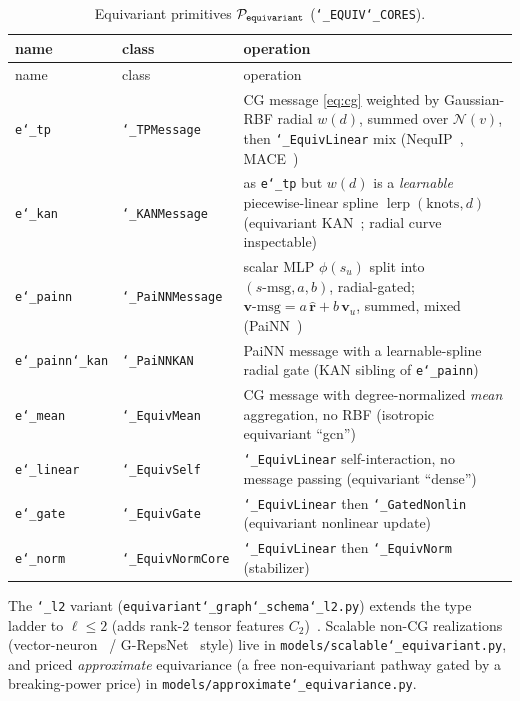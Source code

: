 \documentclass[11pt]{article}
\newcommand{\allowbreakhere}{\discretionary{}{}{}}
\newcommand{\code}[1]{\texttt{\def\_{\char`_\allowbreakhere}#1}}
\newcommand{\Pcal}{\mathcal{P}}
\newcommand{\lerp}{\operatorname{lerp}}
\newcommand{\rhat}{\hat{\bm{r}}}
\begin{document}
\begin{center}
\footnotesize
\renewcommand{\arraystretch}{1.4}
\begin{longtable}{@{}p{1.95cm}p{2.35cm}p{9.2cm}@{}}
\caption{Equivariant primitives $\Pcal_{\code{equivariant}}$ (\code{\_EQUIV\_CORES}).}\label{tab:equiv}\\
\toprule name & class & operation \\ \midrule
\endfirsthead
\toprule name & class & operation \\ \midrule \endhead
\code{e\_tp}      & \code{\_TPMessage}   & CG message \eqref{eq:cg} weighted by Gaussian-RBF radial $w(d)$, summed over $\mathcal N(v)$, then \code{\_EquivLinear} mix (NequIP~\cite{batzner2022nequip}, MACE~\cite{batatia2022mace})\\
\code{e\_kan}     & \code{\_KANMessage}  & as \code{e\_tp} but $w(d)$ is a \emph{learnable} piecewise-linear spline $\lerp(\text{knots},d)$ (equivariant KAN~\cite{hu2025equivkan,liu2024kan}; radial curve inspectable)\\
\code{e\_painn}   & \code{\_PaiNNMessage}& scalar MLP $\phi(s_u)$ split into $(s\text{-msg},a,b)$, radial-gated; $\bm v\text{-msg}=a\,\rhat + b\,\bm v_u$, summed, mixed (PaiNN~\cite{schutt2021painn})\\
\code{e\_painn\_kan}&\code{\_PaiNNKAN}    & PaiNN message with a learnable-spline radial gate (KAN sibling of \code{e\_painn})\\
\code{e\_mean}    & \code{\_EquivMean}   & CG message with degree-normalized \emph{mean} aggregation, no RBF (isotropic equivariant ``gcn'')\\
\code{e\_linear}  & \code{\_EquivSelf}   & \code{\_EquivLinear} self-interaction, no message passing (equivariant ``dense'')\\
\code{e\_gate}    & \code{\_EquivGate}   & \code{\_EquivLinear} then \code{\_GatedNonlin} (equivariant nonlinear update)\\
\code{e\_norm}    & \code{\_EquivNormCore}& \code{\_EquivLinear} then \code{\_EquivNorm} (stabilizer)\\
\bottomrule
\end{longtable}
\end{center}

\noindent The \code{\_l2} variant (\code{equivariant\_graph\_schema\_l2.py}) extends the type
ladder to $\ell\le2$ (adds rank-2 tensor features $C_2$)~\cite{finzi2021emlp,thomas2018tfn}. Scalable non-CG realizations
(vector-neuron~\cite{deng2021vn} / G-RepsNet~\cite{basu2023grepsnet} style) live in \code{models/scalable\_equivariant.py}, and priced
\emph{approximate} equivariance (a free non-equivariant pathway gated by a breaking-power price) in
\code{models/approximate\_equivariance.py}.
\end{document}
